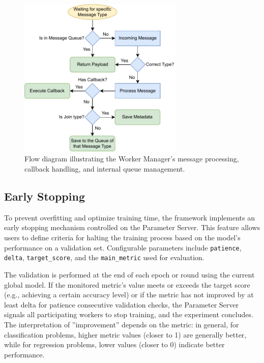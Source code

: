 \begin{figure}[!htbp]
    \centering
    \includegraphics[width=0.7\textwidth]{figs/worker-manager.pdf}
    \caption[Worker Manager Message Processing Flow]{Flow diagram illustrating the Worker Manager's message processing, callback handling, and internal queue management.}
    \label{fig:worker-manager}
\end{figure}

\subsection{Early Stopping}
\label{sec:early-stopping}

To prevent overfitting and optimize training time, the framework implements an early stopping mechanism controlled on the Parameter Server. This feature allows users to define criteria for halting the training process based on the model's performance on a validation set. Configurable parameters include \texttt{patience}, \texttt{delta}, \texttt{target\_score}, and the \texttt{main\_metric} used for evaluation. 

The validation is performed at the end of each epoch or round using the current global model. If the monitored metric's value meets or exceeds the target score (e.g., achieving a certain accuracy level) or if the metric has not improved by at least delta for patience consecutive validation checks, the Parameter Server signals all participating workers to stop training, and the experiment concludes. The interpretation of ''improvement'' depends on the metric: in general, for classification problems, higher metric values (closer to 1) are generally better, while for regression problems, lower values (closer to 0) indicate better performance. 

